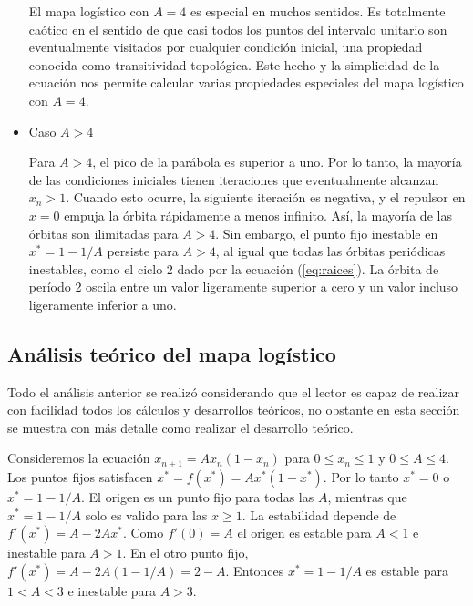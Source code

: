\begin{itemize}
                    El mapa logístico con $ A = 4 $ es especial en muchos sentidos. Es totalmente caótico en el sentido de que casi todos los puntos del intervalo unitario son eventualmente visitados por cualquier condición inicial, una propiedad conocida como transitividad topológica. Este hecho y la simplicidad de la ecuación nos permite calcular varias propiedades especiales del mapa logístico con $ A = 4 $.

                \item Caso $A > 4$

                    Para $A > 4$, el pico de la parábola es superior a uno. Por lo tanto, la mayoría de las condiciones iniciales tienen iteraciones que eventualmente alcanzan $x_{n} > 1$. Cuando esto ocurre, la siguiente iteración es negativa, y el repulsor en $x = 0$ empuja la órbita rápidamente a menos infinito. Así, la mayoría de las órbitas son ilimitadas para $A > 4$. Sin embargo, el punto fijo inestable en $x^{*} = 1 - 1/A$ persiste para $A > 4$, al igual que todas las órbitas periódicas inestables, como el ciclo 2 dado por la ecuación (\ref{eq:raices}). La órbita de período 2 oscila entre un valor ligeramente superior a cero y un valor incluso ligeramente inferior a uno. 

        \end{itemize}

        \subsection{Análisis teórico del mapa logístico}

            Todo el análisis anterior se realizó considerando que el lector es capaz de realizar con facilidad todos los cálculos y desarrollos teóricos, no obstante en esta sección se muestra con más detalle como realizar el desarrollo teórico.

            Consideremos la ecuación $x_{n+1} = A x_{n} (1 - x_{n})$ para $0 \leq x_{n} \leq 1$ y $0 \leq A \leq 4$. Los puntos fijos satisfacen $x^{*} = f(x^{*}) = A x^{*}(1 - x^{*})$. Por lo tanto $x^{*} = 0$  o $x^{*} = 1 - 1/A$. El origen es un punto fijo para todas las $A$, mientras que $x^{*} = 1 - 1/A$ solo es valido para las $x \geq 1$. La estabilidad depende de $f'(x^{*}) = A - 2Ax^{*}$. Como $f'(0) = A $ el origen es estable para $A < 1$ e inestable para $A > 1$. En el otro punto fijo, $f'(x^{*}) = A - 2 A \left( 1 - 1/A \right) = 2 - A$. Entonces $x^{*} = 1 - 1/A$ es estable para $1 < A < 3$ e inestable para $A > 3$.

